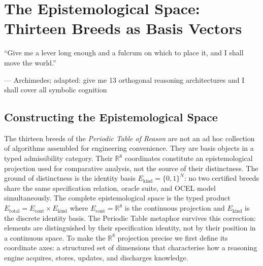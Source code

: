 
\chapter{The Epistemological Space: Thirteen Breeds as Basis Vectors}
\label{chap:epistemological-space}
\label{chap:periodic-table}
\label{chap:table-construction}

\epigraph{%
  ``Give me a lever long enough and a fulcrum on which to place it, and I shall move the world.''
}{--- Archimedes; adapted: give me 13 orthogonal reasoning architectures and I shall cover all symbolic cognition}

\section{Constructing the Epistemological Space}
\label{sec:constructing-epistemological-space}

The thirteen breeds of the \emph{Periodic Table of Reason} are not an ad hoc collection
of algorithms assembled for engineering convenience. They are basis objects in a typed
admissibility category. Their $\mathbb{R}^8$ coordinates constitute an epistemological
projection used for comparative analysis, not the source of their distinctness. The ground
of distinctness is the identity basis $E_{\text{kind}} = \{0,1\}^N$: no two certified
breeds share the same specification relation, oracle suite, and OCEL model simultaneously.
The complete epistemological space is the typed product
$E_{\text{total}} = E_{\text{cont}} \times E_{\text{kind}}$ where
$E_{\text{cont}} = \mathbb{R}^8$ is the continuous projection and $E_{\text{kind}}$ is the
discrete identity basis. The Periodic Table metaphor survives this correction: elements are
distinguished by their specification identity, not by their position in a continuous space.
To make the $\mathbb{R}^8$ projection precise we first define its coordinate axes: a
structured set of dimensions that characterise how a reasoning engine acquires, stores,
updates, and discharges knowledge.


